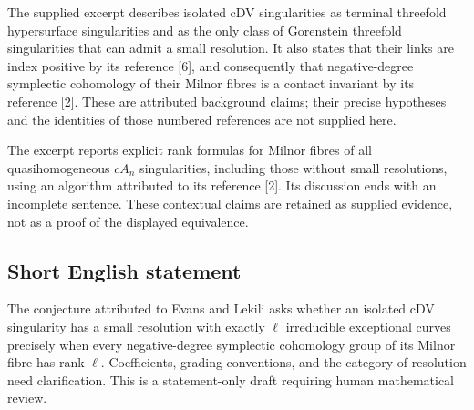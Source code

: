 \documentclass[11pt]{article}
\begin{document}
The supplied excerpt describes isolated cDV singularities as terminal threefold hypersurface singularities and as the only class of Gorenstein threefold singularities that can admit a small resolution. It also states that their links are index positive by its reference [6], and consequently that negative-degree symplectic cohomology of their Milnor fibres is a contact invariant by its reference [2]. These are attributed background claims; their precise hypotheses and the identities of those numbered references are not supplied here.

The excerpt reports explicit rank formulas for Milnor fibres of all quasihomogeneous \(cA_n\) singularities, including those without small resolutions, using an algorithm attributed to its reference [2]. Its discussion ends with an incomplete sentence. These contextual claims are retained as supplied evidence, not as a proof of the displayed equivalence.
\subsection{Short English statement}
The conjecture attributed to Evans and Lekili asks whether an isolated cDV singularity has a small resolution with exactly \(\ell\) irreducible exceptional curves precisely when every negative-degree symplectic cohomology group of its Milnor fibre has rank \(\ell\). Coefficients, grading conventions, and the category of resolution need clarification. This is a statement-only draft requiring human mathematical review.
\end{document}
